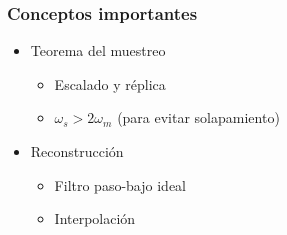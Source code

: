 \documentclass[handout]{beamer}
\numberwithin{section}{part}
\begin{document}
  \begin{frame}\frametitle{Conceptos importantes}
    \begin{itemize}
      \item \alert{Teorema del muestreo}
      \begin{itemize}
        \item Escalado y réplica
        \item $\omega_s>2\omega_m$ (para evitar solapamiento)
      \end{itemize}
      \item \alert{Reconstrucción}
      \begin{itemize}
        \item Filtro paso-bajo ideal
        \item Interpolación
      \end{itemize}
    \end{itemize}
  \end{frame}
\end{document}
